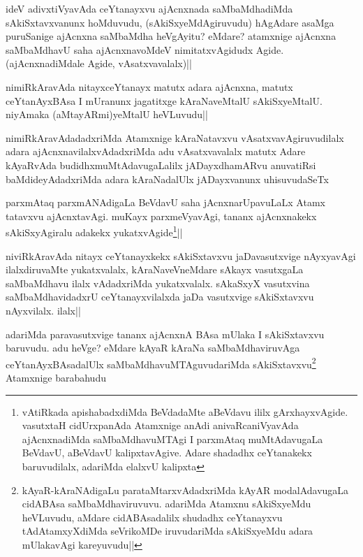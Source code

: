 
\begin{artha}
ideV adivxtiVyavAda ceYtanayxvu ajAcnxnada saMbaMdhadiMda sAkiSxtavxvanunx hoMduvudu, (sAkiSxyeMdAgiruvudu) hAgAdare asaMga puruSanige ajAcnxna saMbaMdha heVgAyitu? eMdare? atamxnige ajAcnxna saMbaMdhavU saha ajAcnxnavoMdeV nimitatxvAgidudx Agide. (ajAcnxnadiMdale Agide, vAsatxvavalalx)||
\end{artha}


\begin{artha}
nimiRkAravAda nitayxceYtanayx matutx adara ajAcnxna, matutx ceYtanAyxBAsa I mUranunx jagatitxge kAraNaveMtalU sAkiSxyeMtalU. niyAmaka (aMtayARmi)yeMtalU heVLuvudu|| 
\end{artha}

\begin{artha}
nimiRkAravAdadadxriMda Atamxnige kAraNatavxvu vAsatxvavAgiruvudilalx adara ajAcnxnavilalxvAdadxriMda adu vAsatxvavalalx matutx Adare kAyaRvAda budidhxmuMtAdavugaLalilx jADayxdhamARvu anuvatiRsi baMdideyAdadxriMda adara kAraNadalUlx jADayxvanunx uhisuvudaSeTx
\end{artha}

\begin{artha}%
parxmAtaq parxmANAdigaLa BeVdavU saha jAcnxnarUpavuLaLx Atamx tatavxvu ajAcnxtavAgi. muKayx parxmeVyavAgi, tananx ajAcnxnakekx sAkiSxyAgiralu adakekx yukatxvAgide\footnote[1]{vAtiRkada apishabadxdiMda BeVdadaMte aBeVdavu ililx gArxhayxvAgide. vasutxtaH cidUrxpanAda Atamxnige anAdi anivaRcaniVyavAda ajAcnxnadiMda saMbaMdhavuMTAgi I parxmAtaq muMtAdavugaLa BeVdavU, aBeVdavU kalipxtavAgive. Adare shadadhx ceYtanakekx baruvudilalx, adariMda elalxvU kalipxta}||
\end{artha}


\begin{artha}
niviRkAravAda nitayx ceYtanayxkekx sAkiSxtavxvu jaDavasutxvige nAyxyavAgi ilalxdiruvaMte yukatxvalalx, kAraNaveVneMdare sAkayx vasutxgaLa saMbaMdhavu ilalx vAdadxriMda yukatxvalalx. sAkaSxyX vasutxvina saMbaMdhavidadxrU ceYtanayxvilalxda jaDa vasutxvige sAkiSxtavxvu nAyxvilalx. ilalx||
\end{artha}


\begin{artha}
adariMda paravasutxvige tananx ajAcnxnA BAsa mUlaka I sAkiSxtavxvu baruvudu. adu heVge? eMdare kAyaR kAraNa saMbaMdhaviruvAga ceYtanAyxBAsadalUlx saMbaMdhavuMTAguvudariMda sAkiSxtavxvu\footnote[2]{kAyaR-kAraNAdigaLu parataMtarxvAdadxriMda kAyAR modalAdavugaLa cidABAsa saMbaMdhaviruvuvu. adariMda Atamxnu sAkiSxyeMdu heVLuvudu, aMdare cidABAsadalilx shudadhx ceYtanayxvu tAdAtamxyXdiMda seVrikoMDe iruvudariMda sAkiSxyeMdu adara mUlakavAgi kareyuvudu||} Atamxnige barabahudu
\end{artha}

